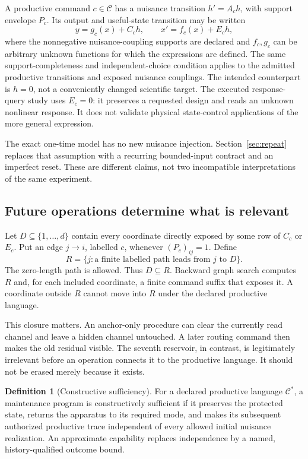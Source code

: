 \documentclass[11pt,letterpaper]{article}
\theoremstyle{definition}\newtheorem{definition}[theorem]{Definition}
\theoremstyle{remark}\newtheorem{remark}[theorem]{Remark}
\begin{document}
A productive command $c\in\mathcal C$ has a nuisance transition $h'=A_ch$, with support envelope $P_c$. Its output and useful-state transition may be written
\begin{equation}
 y=g_c(x)+C_ch,\qquad x'=f_c(x)+E_ch,
 \label{eq:productive}
\end{equation}
where the nonnegative nuisance-coupling supports are declared and $f_c,g_c$ can be arbitrary unknown functions for which the expressions are defined. The same support-completeness and independent-choice condition applies to the admitted productive transitions and exposed nuisance couplings. The intended counterpart is $h=0$, not a conveniently changed scientific target. The executed response-query study uses $E_c=0$: it preserves a requested design and reads an unknown nonlinear response. It does not validate physical state-control applications of the more general expression.

The exact one-time model has no new nuisance injection. Section~\ref{sec:repeat} replaces that assumption with a recurring bounded-input contract and an imperfect reset. These are different claims, not two incompatible interpretations of the same experiment.

\subsection{Future operations determine what is relevant}
Let $D\subseteq\{1,\ldots,d\}$ contain every coordinate directly exposed by some row of $C_c$ or $E_c$. Put an edge $j\to i$, labelled $c$, whenever $(P_c)_{ij}=1$. Define
\begin{equation}
 R=\{j:\text{a finite labelled path leads from }j\text{ to }D\}.
 \label{eq:R}
\end{equation}
The zero-length path is allowed. Thus $D\subseteq R$. Backward graph search computes $R$ and, for each included coordinate, a finite command suffix that exposes it. A coordinate outside $R$ cannot move into $R$ under the declared productive language.

This closure matters. An anchor-only procedure can clear the currently read channel and leave a hidden channel untouched. A later routing command then makes the old residual visible. The seventh reservoir, in contrast, is legitimately irrelevant before an operation connects it to the productive language. It should not be erased merely because it exists.

\begin{definition}[Constructive sufficiency]
For a declared productive language $\mathcal C^*$, a maintenance program is constructively sufficient if it preserves the protected state, returns the apparatus to its required mode, and makes its subsequent authorized productive trace independent of every allowed initial nuisance realization. An approximate capability replaces independence by a named, history-qualified outcome bound.
\end{definition}
\end{document}
